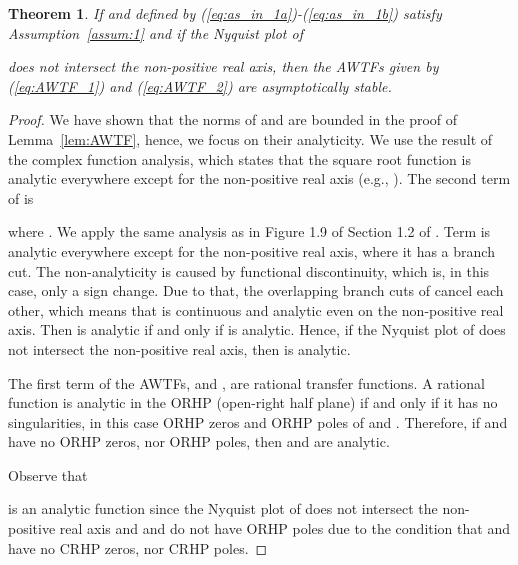 \documentclass[10pt,twocolumn,twoside]{IEEEtran}
\newtheorem{theorem}{Theorem}
\theoremstyle{definition}
\newcommand{\revB}{Black}
\begin{document}
\begin{theorem}\label{lem:AWTF_stab}
If  and  defined by (\ref{eq:as_in_1a})-(\ref{eq:as_in_1b}) satisfy Assumption~\ref{assum:1} and if the Nyquist plot of
 
does not intersect the non-positive real axis, then the AWTFs {\color{\revB}given by (\ref{eq:AWTF_1}) and (\ref{eq:AWTF_2})} are asymptotically stable.
\end{theorem}
\begin{proof}
We have shown that the norms of  and  are bounded in the proof of Lemma~\ref{lem:AWTF}, hence, we focus on their analyticity. We use the result of the complex function analysis, which states that the square root function  is analytic everywhere except for the non-positive real axis (e.g., \cite{stein2010complex}). The second term of  is

where . We apply the same analysis as in Figure 1.9 of Section 1.2 of \cite{Kelly2006}. Term  is analytic everywhere except for the non-positive real axis, where it has a branch cut. The non-analyticity is caused by functional discontinuity, which is, in this case, only a sign change. Due to that, the overlapping branch cuts of  cancel each other, which means that  is continuous and analytic even on the non-positive real axis. Then  is analytic if and only if  is analytic. Hence, if the Nyquist plot of  does not intersect the non-positive real axis, then  is analytic.

The first term of the AWTFs,  and , are rational transfer functions. A rational function is analytic in the ORHP (open-right half plane) if and only if it has no singularities, in this case ORHP zeros and ORHP poles of  and . Therefore, if  and  have no ORHP zeros, nor ORHP poles, then  and  are analytic.

Observe that

is an analytic function since the Nyquist plot of  does not intersect the non-positive real axis and  and  do not have ORHP poles due to the condition that  and  have no CRHP zeros, nor CRHP poles.


\end{proof}
\end{document}
